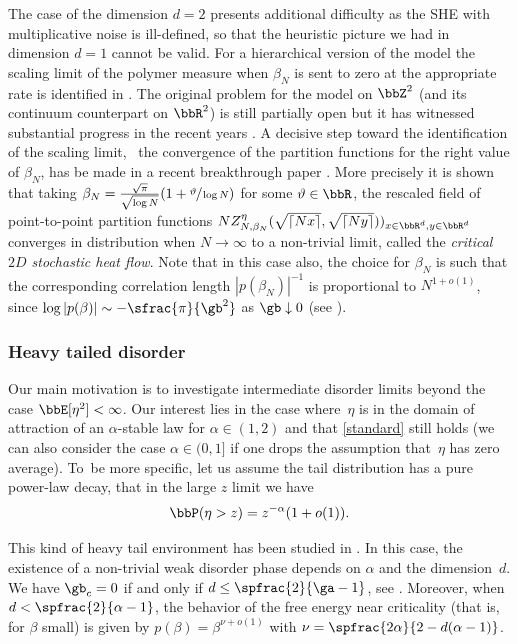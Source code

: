 The case of the dimension $d=2$ presents additional difficulty as the SHE with multiplicative noise is ill-defined, so that the heuristic picture we had in dimension $d=1$ cannot be valid.
For a hierarchical version of the model
the scaling limit of the polymer measure when $\beta_N$ is sent to zero at the appropriate rate is identified in \cite{clark2019}. The original problem for the model on $\bbZ^2$ (and its continuum counterpart on $\bbR^2$) is still partially open but it has witnessed substantial progress in the recent years \cite{CSZ15, CSZ18scaling, gu2019}. A decisive step toward the identification of the scaling limit, \ie \ the convergence of the partition functions for the right value of $\beta_N$, has be made in a recent breakthrough paper \cite{CSZ21}.
More precisely it is shown that taking
$\beta_N = \frac{\sqrt{\pi}}{\sqrt{\log N}} (1+ \sfrac{\vartheta}{\log N})$ for some $\vartheta\in \bbR$,
the rescaled
field of point-to-point partition functions
$N Z^{\eta}_{N, \beta_N}(\sqrt{\lceil Nx\rceil},\sqrt{\lceil Ny \rceil}))_{x\in \bbR^d, y\in \bbR^d}$ converges in distribution when $N\to \infty$ to a non-trivial limit, called the \emph{critical $2D$ stochastic heat flow}.
Note that in this case also, the choice for $\beta_N$ is such that the corresponding correlation length $|p(\beta_N)|^{-1}$ is proportional to $N^{1+o(1)}$,
since $\log |p(\beta)| \sim - \sfrac{\pi}{\gb^2}$ as $\gb\downarrow0$ (see \cite{BL17}).

\subsubsection*{Heavy tailed disorder}
Our main motivation is to investigate intermediate disorder limits beyond the case $\bbE[ \eta^2]<\infty$.
Our interest lies in the case where~$\eta$ is in the domain of attraction of an $\alpha$-stable law for $\alpha\in (1,2)$ and that \eqref{standard} still holds (we can also consider the case $\alpha\in(0,1]$ if one drops the assumption that~$\eta$ has zero average). To~be more specific, let us assume the tail distribution has a pure power-law decay, \ie that in the large $z$ limit we have
\begin{equation}
\label{def:eta}
\bbP(\eta> z) = z^{-\alpha}(1+o(1)).
\end{equation}

This kind of heavy tail environment has been studied in \cite{Vi19}. In this case, the existence of a non-trivial weak disorder phase depends on $\alpha$ and the dimension~$d$. We have $\gb_c=0$
if and only if $d\leq \spfrac{2}{\ga-1}$,
see \cite[Th.\,1.1]{Vi19}.
Moreover, when $d<\nobreak \spfrac{2}{\alpha-1}$,
the behavior of the free energy near criticality (that is, for $\beta$ small) is given by
$p(\beta)=\beta^{\nu+o(1)}$ with $\nu =\spfrac{2\alpha}{2-d(\alpha-1)}$.

